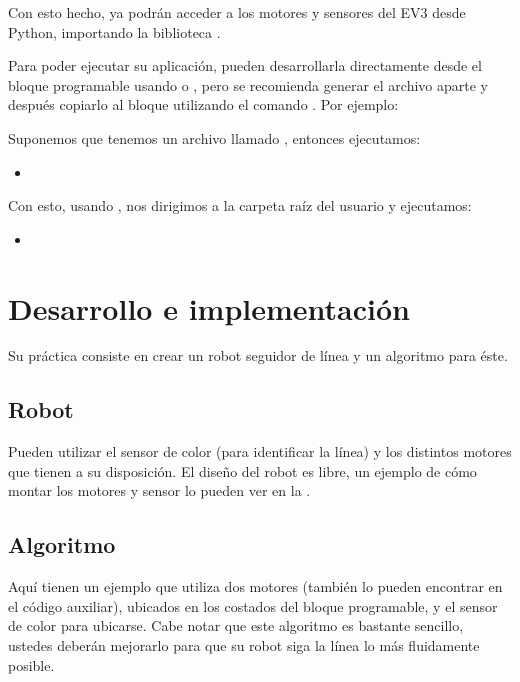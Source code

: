 Con esto hecho, ya podrán acceder a los motores y sensores del EV3 desde Python, importando la biblioteca .\par

Para poder ejecutar su aplicación, pueden desarrollarla directamente desde el bloque programable usando  o , pero se recomienda generar el archivo aparte y después copiarlo al bloque utilizando el comando . Por ejemplo:

Suponemos que tenemos un archivo llamado , entonces ejecutamos:

\begin{itemize}
 \item {}
\end{itemize}

Con esto, usando , nos dirigimos a la carpeta raíz del usuario y ejecutamos:

\begin{itemize}
 \item {}
\end{itemize}

\section{Desarrollo e implementación}

Su práctica consiste en crear un robot seguidor de línea y un algoritmo para éste.

\subsection{Robot}

Pueden utilizar el sensor de color (para identificar la línea) y los distintos motores que tienen a su disposición. El diseño del robot es libre, un ejemplo de cómo montar los motores y sensor lo pueden ver en la .

\subsection{Algoritmo}

Aquí tienen un ejemplo que utiliza dos motores (también lo pueden encontrar en el código auxiliar), ubicados en los costados del bloque programable, y el sensor de color para ubicarse. Cabe notar que este algoritmo es bastante sencillo, ustedes deberán mejorarlo para que su robot siga la línea lo más fluidamente posible.

